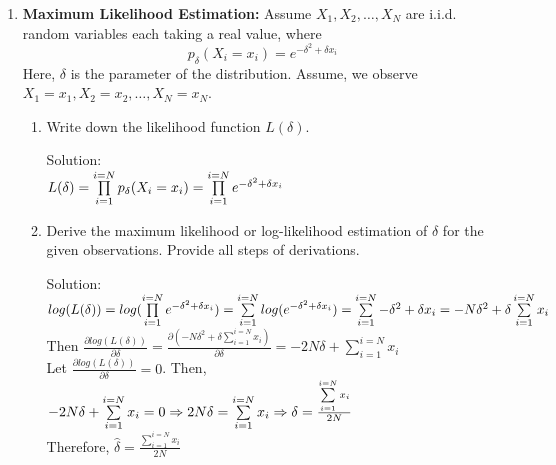 \documentclass[12pt]{article}
\newcommand{\solu}{{\color{blue} Solution:}}
\newcommand{\indep}{\perp \!\!\! \perp}
\begin{document}
\begin{enumerate}
\begin{enumerate}
            \solu
            \begin{proof}
                $X \indep Y \Rightarrow P(XY) = P(X)P(Y)$\\
                $E(XY) \\
                = \sum xyP(XY) \\
                = \sum xyP(X)P(Y)\\
                = \sum xP(X) \sum yP(Y)\\
                = E[X]E[Y]$
            \end{proof}
        \end{enumerate}

        \item \textbf{Maximum Likelihood Estimation:} Assume $X_1, X_2, \dots, X_N$ are i.i.d. random variables each taking a real value, where
        $$p_\delta(X_i = x_i) = e^{-\delta^2+\delta x_i}$$
        Here, $\delta$ is the parameter of the distribution. Assume, we observe $X_1 = x_1, X_2 = x_2, \dots, X_N = x_N$.
        \begin{enumerate}
            \item Write down the likelihood function $L(\delta)$.
            
            \solu \\
            $L(\delta) = \prod\limits_{i = 1}^{i = N}p_\delta(X_i = x_i) \\
            = \prod\limits_{i = 1}^{i = N}e^{-\delta^2+\delta x_i} $

            \item Derive the maximum likelihood or log-likelihood estimation of $\delta$ for the given observations. Provide all steps of derivations.
            
            \solu \\
            $log(L(\delta)) = log(\prod\limits_{i = 1}^{i = N} e^{-\delta^2+\delta x_i}) \\
            = \sum\limits_{i = 1}^{i = N} log(e^{-\delta^2+\delta x_i})\\
            = \sum\limits_{i = 1}^{i = N} -\delta^2+\delta x_i\\
            = -N\delta^2 + \delta\sum\limits_{i = 1}^{i = N}x_i$\\
            Then $\frac{\partial log(L(\delta))}{\partial \delta} 
            = \frac{\partial( -N\delta^2 + \delta\sum\limits_{i = 1}^{i = N}x_i)}{\partial \delta}
            = -2N\delta + \sum\limits_{i = 1}^{i = N}x_i$\\
            Let $\frac{\partial log(L(\delta))}{\partial \delta} = 0$.
            Then, $-2N\delta + \sum\limits_{i = 1}^{i = N}x_i = 0\\
            \Rightarrow 2N\delta = \sum\limits_{i = 1}^{i = N}x_i
            \Rightarrow \delta = \frac{\sum\limits_{i = 1}^{i = N}x_i}{2N}$\\
            Therefore, $\hat{\delta} = \frac{\sum\limits_{i = 1}^{i = N}x_i}{2N}$
        \end{enumerate}


\end{enumerate}
\end{document}
